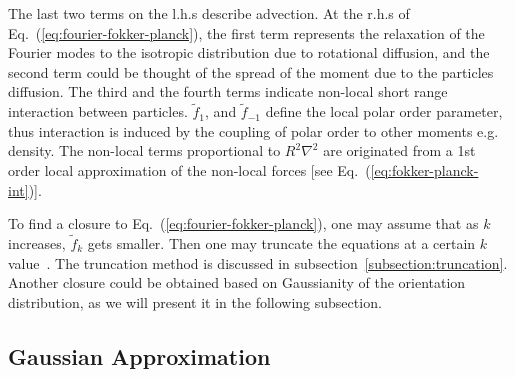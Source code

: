 \documentclass[reprint,floatfix,amsmath,amssymb,aps,pre,showkeys,showpacs,superscriptaddress]{revtex4-1}
\newcommand{\hl}[1]{\textcolor{hlcolor}{#1}}
\newcommand{\req}[1]{Eq.~(\ref{#1})}
\begin{document}
The last two terms on the l.h.s \hl{describe} advection. \hl{At} the r.h.s of \req{eq:fourier-fokker-planck}, the first term represents the relaxation of the Fourier modes to the isotropic distribution due to rotational diffusion, and the second term could be thought of the spread of the moment due to the particles diffusion. The third and the \hl{fourth} terms indicate non-local short range interaction between particles. $\tilde{f}_1$, and $\tilde{f}_{-1}$ \hl{define the local polar order parameter}, thus interaction is induced by the coupling of polar order to other moments e.g. density. The non-local terms proportional to $R^2 \nabla^2$ are originated from \hl{a 1st order local approximation of the non-local forces} [see \req{eq:fokker-planck-int}].



To find a closure to \req{eq:fourier-fokker-planck}, one may assume that as $k$ increases, $\tilde{f}_k$ gets smaller. Then one may truncate the equations at a certain $k$ value~\cite{Bertin2006,Bertin2009,Peshkov2012,Peshkov2012continuous}. The truncation method is discussed in subsection~\ref{subsection:truncation}.  Another closure could be obtained based on Gaussianity of the \hl{orientation} distribution, as we will present it in the following subsection.

\subsection{Gaussian Approximation}
\label{subsection:GA}
\end{document}
